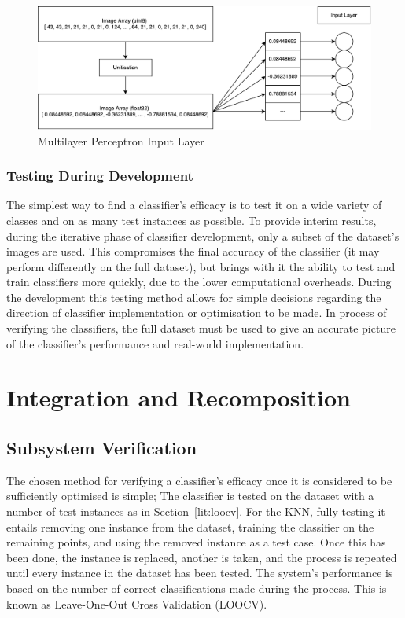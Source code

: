 \begin{figure}[!h]
	
	\centering
	\includegraphics[width=\textwidth]{figures/multilayer_perceptron_input}
	\centering
	\caption{Multilayer Perceptron Input Layer}
	\label{fig:multi_input}
\end{figure}


\subsubsection{Testing During Development}
The simplest way to find a classifier's efficacy is to test it on a wide variety of classes and on as many test instances as possible. To provide interim results, during the iterative phase of classifier development, only a subset of the dataset's images are used. This compromises the final accuracy of the classifier (it may perform differently on the full dataset), but brings with it the ability to test and train classifiers more quickly, due to the lower computational overheads. During the development this testing method allows for simple decisions regarding the direction of classifier implementation or optimisation to be made. In process of verifying the classifiers, the full dataset must be used to give an accurate picture of the classifier's performance and real-world implementation. 

\section{Integration and Recomposition}

\subsection{Subsystem Verification}
The chosen method for verifying a classifier's efficacy once it is considered to be sufficiently optimised is simple; The classifier is tested on the dataset with a number of test instances as in Section~\ref{lit:loocv}. For the KNN, fully testing it entails removing one instance from the dataset, training the classifier on the remaining points, and using the removed instance as a test case. Once this has been done, the instance is replaced, another is taken, and the process is repeated until every instance in the dataset has been tested. The system's performance is based on the number of correct classifications made during the process. This is known as Leave-One-Out Cross Validation (LOOCV).

